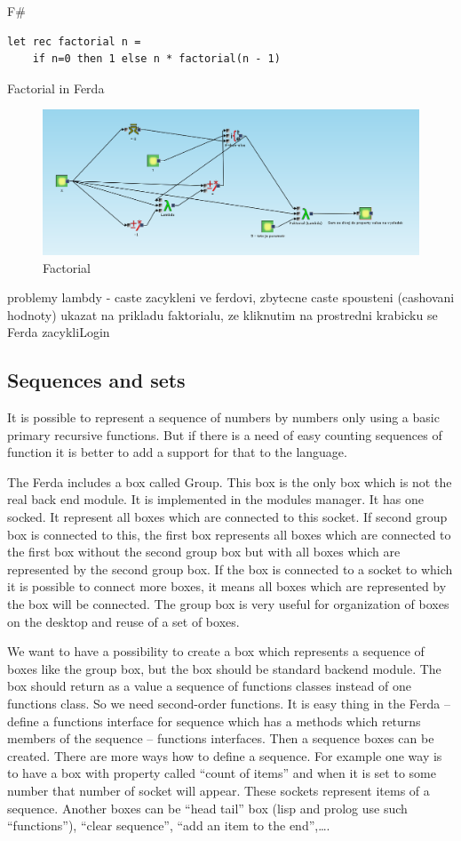 \documentclass[a4paper,12pt]{book}
\begin{document}
F\#
\begin{verbatim}
let rec factorial n =
    if n=0 then 1 else n * factorial(n - 1)
\end{verbatim}
	
Factorial in Ferda
\begin{figure}
\includegraphics[width=13.72cm]{faktorial}
	\caption{Factorial}
\end{figure}

problemy lambdy - caste zacykleni ve ferdovi, zbytecne caste spousteni (cashovani hodnoty)
ukazat na prikladu faktorialu, ze kliknutim na prostredni krabicku se Ferda zacykliLogin

\subsection{Sequences and sets}
It is possible to represent a sequence of numbers by numbers only using a basic primary recursive functions. But if there is a need of easy counting sequences of function it is better to add a support for that to the language.

The Ferda includes a box called Group. This box is the only box which is not the real back end module. It is implemented in the modules manager. It has one socked. It represent all boxes which are connected to this socket. If second group box is connected to this, the first box represents all boxes which are connected to the first box without the second group box but with all boxes which are represented by the second group box. If the box is connected to a socket to which it is possible to connect more boxes, it means all boxes which are represented by the box will be connected. The group box is very useful for organization of boxes on the desktop and reuse of a set of boxes.

We want to have a possibility to create a box which represents a sequence of boxes like the group box, but the box should be standard backend module. The box should return as a value a sequence of functions classes instead of one functions class. So we need second-order functions. It is easy thing in the Ferda -- define a functions interface for sequence which has a methods which returns members of the sequence -- functions interfaces. Then a sequence boxes can be created. There are more ways how to define a sequence. For example one way is to have a box with property called ``count of items'' and when it is set to some number that number of socket will appear. These sockets represent items of a sequence. Another boxes can be ``head tail'' box (lisp and prolog use such ``functions''), ``clear sequence'',  ``add an item to the end'',\dots.
\end{document}
